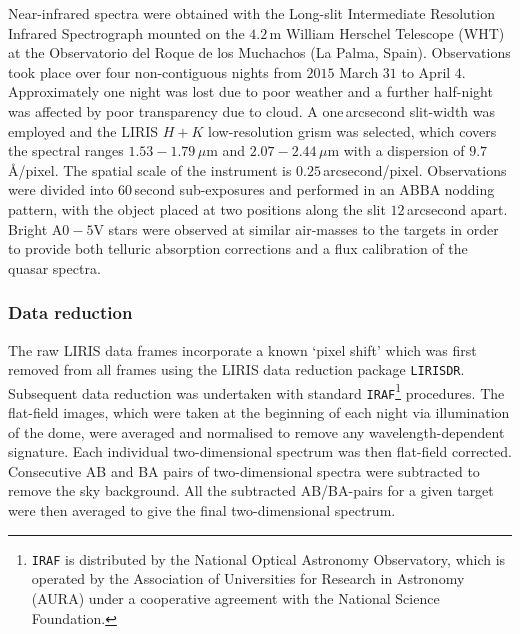 Near-infrared spectra were obtained with the Long-slit Intermediate Resolution Infrared Spectrograph \citep[LIRIS;][]{manchado98} mounted on the $4.2$\,m William Herschel Telescope (WHT) at the Observatorio del Roque de los Muchachos (La Palma, Spain). 
Observations took place over four non-contiguous nights from $2015$ March $31$ to April $4$. 
Approximately one night was lost due to poor weather and a further half-night was affected by poor transparency due to cloud. 
A one\,arcsecond slit-width was employed and the LIRIS $H+K$ low-resolution grism was selected, which covers the spectral ranges $1.53-1.79$\,$\mu$m and $2.07-2.44$\,$\mu$m with a dispersion of $9.7$\,\AA/pixel. 
The spatial scale of the instrument is $0.25$\,arcsecond/pixel. 
Observations were divided into $60$\,second sub-exposures and performed in an ABBA nodding pattern, with the object placed at two positions along the slit $12$\,arcsecond apart. 
Bright A$0-5$V stars were observed at similar air-masses to the targets in order to provide both telluric absorption corrections and a flux calibration of the quasar spectra.

\subsubsection{Data reduction}

The raw LIRIS data frames incorporate a known `pixel shift' which was first removed from all frames using the LIRIS data reduction package \texttt{LIRISDR}. 
Subsequent data reduction was undertaken with standard \texttt{IRAF}\footnote{\texttt{IRAF} is distributed by the National Optical Astronomy Observatory, which is operated by the Association of Universities for Research in Astronomy (AURA) under a cooperative agreement with the National Science Foundation.} procedures.  
The flat-field images, which were taken at the beginning of each night via illumination of the dome, were averaged and normalised to remove any wavelength-dependent signature. 
Each individual two-dimensional spectrum was then flat-field corrected. 
Consecutive AB and BA pairs of two-dimensional spectra were subtracted to remove the sky background. 
All the subtracted AB/BA-pairs for a given target were then averaged to give the final two-dimensional spectrum.


